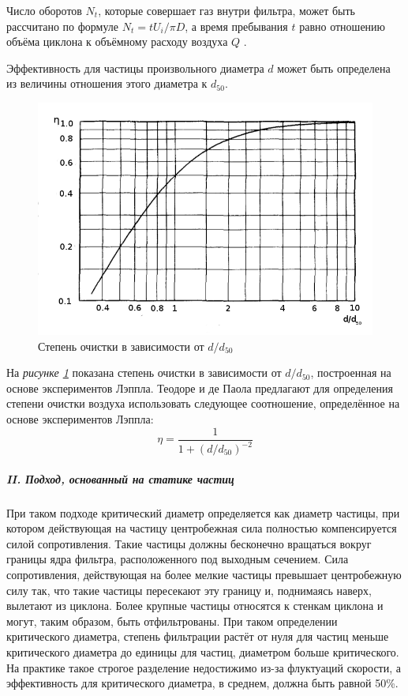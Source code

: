 	Число оборотов $N_t$, которые совершает газ внутри фильтра, может быть рассчитано по формуле $N_t = tU_i/\pi D$, а время пребывания $t$ равно отношению объёма циклона к объёмному расходу воздуха $Q$ \cite{Kuo}.
	
	Эффективность для частицы произвольного диаметра $d$ может быть определена из величины отношения этого диаметра к $d_{50}$.
	\begin{figure}[ht]
		\centering
		\includegraphics[scale=0.5]{Lapple}
		\caption{Степень очистки в зависимости от $d/d_{50}$}
		\label{fig:lapple}
	\end{figure}
	На \textit{рисунке \ref{fig:lapple}} показана степень очистки в зависимости от $d/d_{50}$, построенная на основе экспериментов Лэппла. Теодоре и де Паола \cite{Theodore} предлагают для определения степени очистки воздуха использовать следующее соотношение, определённое на основе экспериментов Лэппла:
			\begin{equation}
				\eta = \frac{1}{1 + (d/d_{50})^{-2}}
			\end{equation}
			\subparagraph{II. Подход, основанный на статике частиц\\}
			При таком подходе критический диаметр определяется как диаметр частицы, при котором действующая на частицу центробежная сила полностью компенсируется силой сопротивления. Такие частицы должны бесконечно вращаться вокруг границы ядра фильтра, расположенного под выходным сечением. Сила сопротивления, действующая на более мелкие частицы превышает центробежную силу так, что такие частицы пересекают эту границу и, поднимаясь наверх, вылетают из циклона. Более крупные частицы относятся к стенкам циклона и могут, таким образом, быть отфильтрованы. При таком определении критического диаметра, степень фильтрации растёт от нуля для частиц меньше критического диаметра до единицы для частиц, диаметром больше критического. На практике такое строгое разделение недостижимо из-за флуктуаций скорости, а эффективность для критического диаметра, в среднем, должна быть равной 50\%.
			
